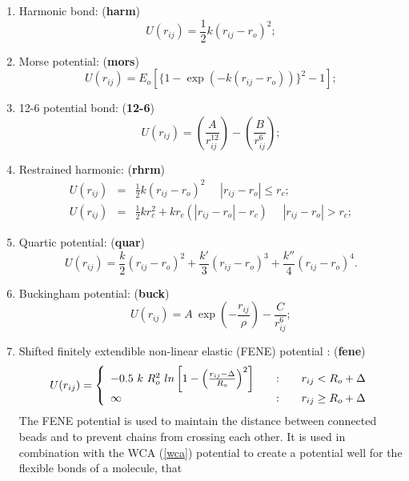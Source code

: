 \begin{enumerate}
\item Harmonic bond: ({\bf harm})
\begin{equation}
 U(r_{ij})=\frac{1}{2}k(r_{ij}-r_{o})^2;
\end{equation}
\item Morse potential:  ({\bf mors})
\begin{equation}
U(r_{ij})=E_{o}[\{1-\exp(-k(r_{ij}-r_{o}))\}^{2}-1];
\end{equation}
\item 12-6 potential bond: ({\bf 12-6})
\begin{equation}
U(r_{ij})=\left(\frac{A}{r_{ij}^{12}}\right)-\left(\frac{B}{r_{ij}^{6}}\right);
\end{equation}
\item Restrained harmonic:  ({\bf rhrm})
\begin{eqnarray}
U(r_{ij})&=&\frac{1}{2}k(r_{ij}-r_{o})^2~~~~~~|r_{ij}-r_{o}|\le
r_{c};\\
U(r_{ij})&=&\frac{1}{2}kr_{c}^2+kr_{c}(|r_{ij}-r_{o}|-r_{c})~~~~~~|r_{ij}-r_{o}|>
r_{c};
\end{eqnarray}
\item Quartic potential:  ({\bf quar})
\begin{equation}
U(r_{ij})=\frac{k}{2}(r_{ij}-r_{o})^2+\frac{k'}{3}(r_{ij}-r_{o})^3+\frac{k''}{4}(r_{ij}-r_{o})^4.
\end{equation}
\item Buckingham potential: ({\bf buck})
\begin{equation}
U(r_{ij})=A~\exp\left(-\frac{r_{ij}}{\rho}\right)-\frac{C}{r_{ij}^{6}};
\end{equation}
\item Shifted finitely extendible non-linear elastic (FENE) potential \cite{warner-72,bird-77,grest-86}:  ({\bf fene})
\begin{equation}
U(r_{ij}) = \left\{ \begin{array} {l@{\qquad:\qquad}l}
-0.5~k~R_{o}^{2}~ln\left[1-\left(\frac{r_{ij}-\Delta}{R_{o}}\right)^{2}\right] & r_{ij} < R_{o} + \Delta \\
\infty & r_{ij} \ge R_{o} + \Delta \end{array} \right. \label{FENE}
\end{equation}
The FENE potential is used to maintain the distance between
connected beads and to prevent chains from crossing each other. It
is used in combination with the WCA (\ref{wca}) potential to create
a potential well for the flexible bonds of a molecule, that

\end{enumerate}
